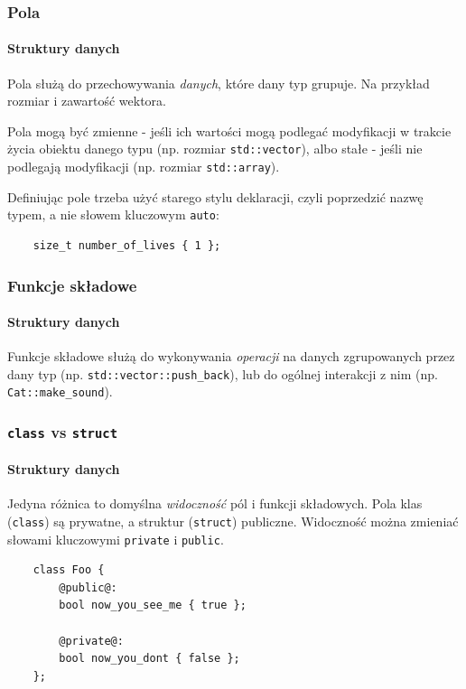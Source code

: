 \documentclass[aspectratio=169,10pt]{beamer}
\begin{document}
\begin{frame}[fragile]
    \frametitle{Pola}
    \framesubtitle{Struktury danych}

    Pola służą do przechowywania \emph{danych}, które dany typ grupuje. Na
    przykład rozmiar i zawartość wektora.

    Pola mogą być zmienne - jeśli ich wartości mogą podlegać modyfikacji w
    trakcie życia obiektu danego typu (np. rozmiar {\tt std::vector}), albo
    stałe - jeśli nie podlegają modyfikacji (np. rozmiar {\tt std::array}).

    \vspace{1em}

    Definiując pole trzeba użyć starego stylu deklaracji, czyli poprzedzić nazwę
    typem, a nie słowem kluczowym {\tt auto}:

    {\scriptsize
    \begin{lstlisting}
    size_t number_of_lives { 1 };
    \end{lstlisting}}
\end{frame}

\begin{frame}
    \frametitle{Funkcje składowe}
    \framesubtitle{Struktury danych}

    Funkcje składowe służą do wykonywania \emph{operacji} na danych zgrupowanych
    przez dany typ (np. {\tt std::vector::push\_back}), lub do ogólnej
    interakcji z nim (np. {\tt Cat::make\_sound}).
\end{frame}

\begin{frame}[fragile]
    \frametitle{{\tt class} vs {\tt struct}}
    \framesubtitle{Struktury danych}

    Jedyna różnica to domyślna \emph{widoczność} pól i funkcji składowych. Pola
    klas ({\tt class}) są prywatne, a struktur ({\tt struct}) publiczne.
    Widoczność można zmieniać słowami kluczowymi {\tt private} i {\tt public}.

    {\scriptsize
    \begin{lstlisting}
    class Foo {
        @public@:
        bool now_you_see_me { true };

        @private@:
        bool now_you_dont { false };
    };
    \end{lstlisting}}
\end{frame}
\end{document}
